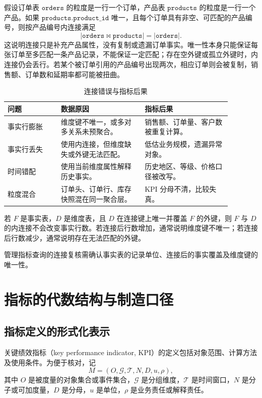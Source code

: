 假设订单表 \(\texttt{orders}\) 的粒度是一行一个订单，产品表 \(\texttt{products}\) 的粒度是一行一个产品。如果 \(\texttt{products.product\_id}\) 唯一，且每个订单具有非空、可匹配的产品编号，则按产品编号内连接满足
\[
|\texttt{orders}\Join\texttt{products}|=|\texttt{orders}|.
\]
这说明连接只是补充产品属性，没有复制或遗漏订单事实。唯一性本身只能保证每张订单至多匹配一条产品记录，不能保证一定匹配；存在空外键或孤立外键时，内连接仍会丢行。若某个被订单引用的产品编号出现两次，相应订单则会被复制，销售额、订单数和延期率都可能被扭曲。

\begin{table}[htbp]
\centering
\caption{连接错误与指标后果}
\begin{tabular}{P{0.21\linewidth}P{0.33\linewidth}P{0.34\linewidth}}
\toprule
{}
问题 & 数据原因 & 指标后果\\
\midrule

事实行膨胀 & 维度键不唯一，或多对多关系未预聚合。 & 销售额、订单量、客户数被重复计算。\\
事实行丢失 & 使用内连接，但维度缺失或外键无法匹配。 & 低估业务规模，遗漏异常对象。\\
时间错配 & 使用当前维度属性解释历史事实。 & 历史地区、等级、价格口径被改写。\\
粒度混合 & 订单头、订单行、库存快照混在同一聚合层。 & KPI 分母不清，比较失真。\\
\bottomrule
\end{tabular}
\end{table}

\begin{proposition}[连接前后的行数检查]
若 \(F\) 是事实表，\(D\) 是维度表，且 \(D\) 在连接键上唯一并覆盖 \(F\) 的外键，则 \(F\) 与 \(D\) 的内连接不会改变事实行数。若连接后行数增加，通常说明维度键不唯一；若连接后行数减少，通常说明存在无法匹配的外键。
\end{proposition}

管理指标查询的连接复核需确认事实表的记录单位、连接后的事实覆盖及维度键的唯一性。

\section{指标的代数结构与制造口径}
\subsection{指标定义的形式化表示}

关键绩效指标（key performance indicator, KPI）的定义包括对象范围、计算方法及使用条件。为便于核对，记
\[
M=(O,\mathcal G,\mathcal T,N,D,u,\rho),
\]
其中 \(O\) 是被度量的对象集合或事件集合，\(\mathcal G\) 是分组维度，\(\mathcal T\) 是时间窗口，\(N\) 是分子或可加度量，\(D\) 是分母，\(u\) 是单位，\(\rho\) 是业务责任或解释责任。

